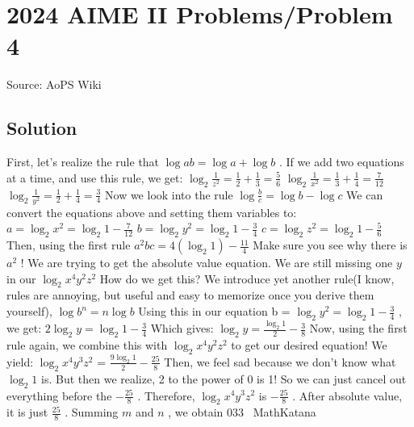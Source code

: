 \documentclass[12pt]{article}
\begin{document}
\section*{{2024 AIME II Problems/Problem 4}}
Source: AoPS Wiki

\subsection*{Solution}
First, let’s realize the rule that $\log{a}{b}=\log{a}+\log{b}$ . If we add two equations at a time, and use this rule, we get: $\log_2{\frac{1}{z^2}} = \frac{1}{2}+\frac{1}{3}= \frac{5}{6}$ $\log_2{\frac{1}{x^2}} = \frac{1}{3}+\frac{1}{4}= \frac{7}{12}$ $\log_2{\frac{1}{y^2}} = \frac{1}{2}+\frac{1}{4}= \frac{3}{4}$ Now we look into the rule $\log{\frac{b}{c}}=\log{b}-\log{c}$ We can convert the equations above and setting them variables to: $a = \log_2{x^2}=\log_2{1}-\frac{7}{12}$ $b = \log_2{y^2}=\log_2{1}-\frac{3}{4}$ $c = \log_2{z^2}=\log_2{1}-\frac{5}{6}$ Then, using the first rule $a^2bc = 4(\log_2{1})-\frac{11}{4}$ Make sure you see why there is $a^2$ ! We are trying to get the absolute value equation. We are still missing one $y$ in our $\log_2{x^4y^2z^2}$ How do we get this? We introduce yet another rule(I know, rules are annoying, but useful and easy to memorize once you derive them yourself), $\log{b^n}=n\log{b}$ Using this in our equation b = $\log_2{y^2}=\log_2{1}-\frac{3}{4}$ , we get: $2\log_2{y} = \log_2{1}-\frac{3}{4}$ Which gives: $\log_2{y}=\frac{\log_2{1}}{2}-\frac{3}{8}$ Now, using the first rule again, we combine this with $\log_2{x^4y^2z^2}$ to get our desired equation! We yield: $\log_2{x^4y^3z^2}$ = $\frac{9\log_2{1}}{2}-\frac{25}{8}$ Then, we feel sad because we don’t know what $\log_2{1}$ is. But then we realize, 2 to the power of 0 is 1! So we can just cancel out everything before the $-\frac{25}{8}$ . Therefore, $\log_2{x^4y^3z^2}$ is $-\frac{25}{8}$ . After absolute value, it is just $\frac{25}{8}$ . Summing $m$ and $n$ , we obtain $\boxed{033}$ ~MathKatana
\end{document}

